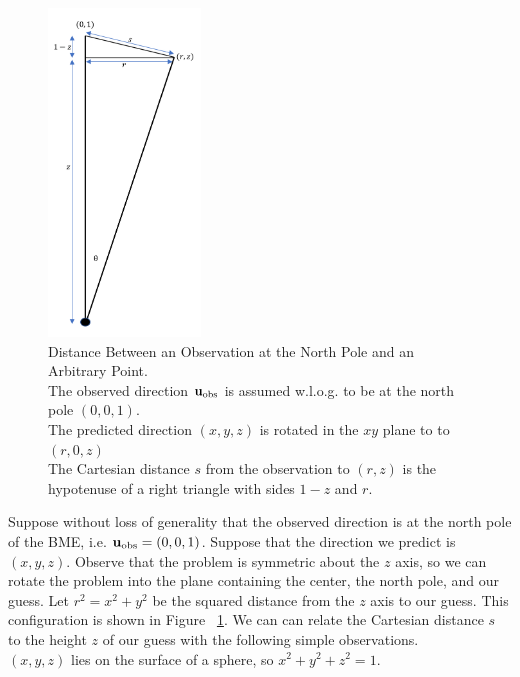 \begin{figure}[hbt!]
\begin{center}
\includegraphics[width=0.36\textwidth]{../figs/misc/orange_slice.png}
\end{center}
\caption[Distance Between an Observation at the North Pole and an Arbitrary Point]
{Distance Between an Observation at the North Pole and an Arbitrary Point.\\
The observed direction $\mathbf{u}_{\mathrm{obs}}$ is assumed w.l.o.g. to be at the north pole $(0, 0, 1)$.\\
The predicted direction $(x,y,z)$ is rotated in the $xy$ plane to to $(r, 0, z)$ \\
The Cartesian distance $s$ from the observation to $(r,z)$ is the hypotenuse of a right triangle with sides $1-z$ and $r$.}
\label{fig:OrangeSlice}
\end{figure}
Suppose without loss of generality that the observed direction is at the north pole of the BME, i.e. $\mathbf{u}_{\mathrm{obs}} = (0, 0, 1)$.
Suppose that the direction we predict is $(x, y, z)$.
Observe that the problem is symmetric about the $z$ axis, so we can rotate the problem into 
the plane containing the center, the north pole, and our guess.
Let $r^2 = x^2 + y^2$ be the squared distance from the $z$ axis to our guess.
This configuration is shown in Figure ~\ref{fig:OrangeSlice}.
We can can relate the Cartesian distance $s$ to the height $z$ of our guess with the following simple observations.\\
$(x, y, z)$ lies on the surface of a sphere, so $x^2 + y^2 + z^2 = 1$.\\
